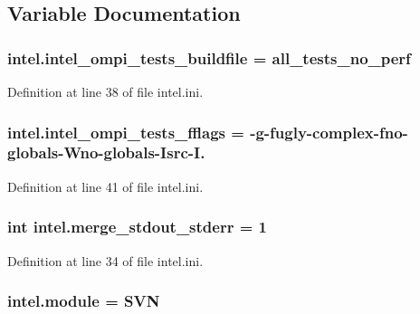 \subsection{Variable Documentation}
\hypertarget{namespaceintel_a6d37e743ba16cdc0edc8c8a459e81ef1}{
\subsubsection[{intel\-\_\-ompi\-\_\-tests\-\_\-buildfile}]{\setlength{\rightskip}{0pt plus 5cm}intel.\-intel\-\_\-ompi\-\_\-tests\-\_\-buildfile = all\-\_\-tests\-\_\-no\-\_\-perf}}\label{namespaceintel_a6d37e743ba16cdc0edc8c8a459e81ef1}


Definition at line 38 of file intel.\-ini.

\hypertarget{namespaceintel_a2519f22774a6f062a8d9c1a0ca33f855}{
\subsubsection[{intel\-\_\-ompi\-\_\-tests\-\_\-fflags}]{\setlength{\rightskip}{0pt plus 5cm}intel.\-intel\-\_\-ompi\-\_\-tests\-\_\-fflags = -\/g-\/fugly-\/complex-\/fno-\/globals-\/Wno-\/globals-\/Isrc-\/I.}}\label{namespaceintel_a2519f22774a6f062a8d9c1a0ca33f855}


Definition at line 41 of file intel.\-ini.

\hypertarget{namespaceintel_abcdeb2ca543c96841368e04128f5f60a}{
\subsubsection[{merge\-\_\-stdout\-\_\-stderr}]{\setlength{\rightskip}{0pt plus 5cm}int intel.\-merge\-\_\-stdout\-\_\-stderr = 1}}\label{namespaceintel_abcdeb2ca543c96841368e04128f5f60a}


Definition at line 34 of file intel.\-ini.

\hypertarget{namespaceintel_a69d4dd86ec6bbe47c3b61b1f6ff2ee90}{
\subsubsection[{module}]{\setlength{\rightskip}{0pt plus 5cm}intel.\-module = S\-V\-N}}\label{namespaceintel_a69d4dd86ec6bbe47c3b61b1f6ff2ee90}


